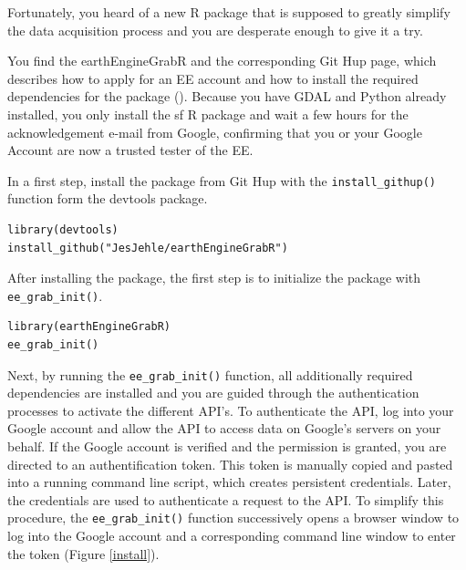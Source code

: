 Fortunately, you heard of a new R package that is supposed to greatly simplify the data acquisition process and you are desperate enough to give it a try. 

You find the earthEngineGrabR and the corresponding Git Hup page, which describes how to apply for an EE account and how to install the required dependencies for the package (\cite{earthEngineGrabR}). Because you have GDAL and Python already installed, you only install the sf R package and wait a few hours for the acknowledgement e-mail from Google, confirming that you or your Google Account are now a trusted tester of the EE.

In a first step, install the package from Git Hup with the \texttt{install\_githup()} function form the devtools package.

\begin{lstlisting}
library(devtools)
install_github("JesJehle/earthEngineGrabR")
\end{lstlisting}

After installing the package, the first step is to initialize the package with \texttt{ee\_grab\_init()}. 

\begin{lstlisting}
library(earthEngineGrabR)
ee_grab_init()
\end{lstlisting}

Next, by running the \texttt{ee\_grab\_init()} function, all additionally required dependencies are installed and you are guided through the authentication processes to activate the different API's. To authenticate the API, log into your Google account and allow the API to access data on Google's servers on your behalf. 
If the Google account is verified and the permission is granted, you are directed to an authentification token. This token is manually copied and pasted into a running command line script, which creates persistent credentials. Later, the credentials are used to authenticate a request to the API. To simplify this procedure, the \texttt{ee\_grab\_init()} function successively opens a browser window to log into the Google account and a corresponding command line window to enter the token (Figure \ref{install}). 

